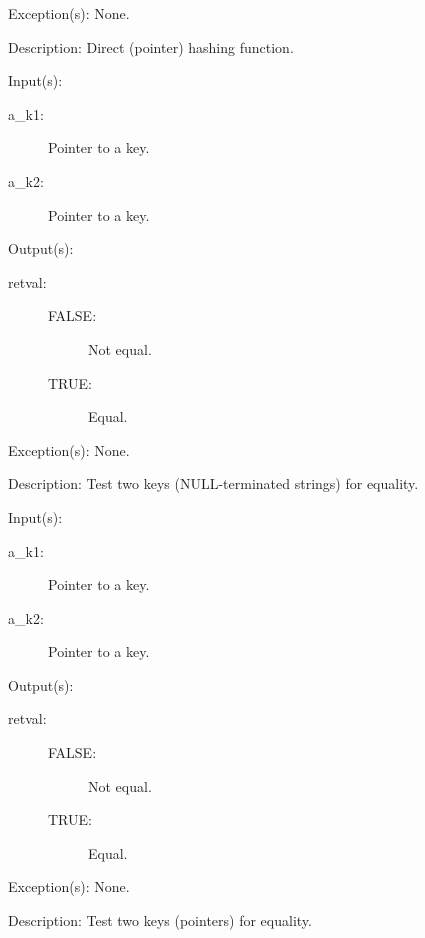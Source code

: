 \begin{capi}
\begin{capilist}
	\item[Exception(s): ] None.
	\item[Description: ]
		Direct (pointer) hashing function.
	\end{capilist}
\label{ch_string_key_comp}
	\begin{capilist}
	\item[Input(s): ]
		\begin{description}\item[]
		\item[a\_k1: ]
			Pointer to a key.
		\item[a\_k2: ]
			Pointer to a key.
		\end{description}
	\item[Output(s): ]
		\begin{description}\item[]
		\item[retval: ]
			\begin{description}\item[]
			\item[FALSE: ]
				Not equal.
			\item[TRUE: ]
				Equal.
			\end{description}
		\end{description}
	\item[Exception(s): ] None.
	\item[Description: ]
		Test two keys (NULL-terminated strings) for equality.
	\end{capilist}
\label{ch_direct_key_comp}
	\begin{capilist}
	\item[Input(s): ]
		\begin{description}\item[]
		\item[a\_k1: ]
			Pointer to a key.
		\item[a\_k2: ]
			Pointer to a key.
		\end{description}
	\item[Output(s): ]
		\begin{description}\item[]
		\item[retval: ]
			\begin{description}\item[]
			\item[FALSE: ]
				Not equal.
			\item[TRUE: ]
				Equal.
			\end{description}
		\end{description}
	\item[Exception(s): ] None.
	\item[Description: ]
		Test two keys (pointers) for equality.
	\end{capilist}
\end{capi}
